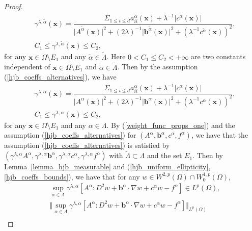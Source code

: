 \documentclass[12pt]{amsart}
\newcommand{\boldx}{\boldsymbol{x}}
\theoremstyle{definition}
\theoremstyle{remark}
\begin{document}
\begin{proof}
\begin{align*}
& \gamma^{\lambda,\tilde{\alpha}}(\boldx) 
= \dfrac{\Sigma_{1\leq i \leq d}a_{ii}^{\tilde{\alpha}}
(\boldx)+ \lambda^{-1}\vert c^{\tilde{\alpha}}(\boldx)
\vert}{\vert A^{\tilde{\alpha}}(\boldx)\vert^{2}+(2\lambda)^{-1}
\vert \boldsymbol{b}^{\tilde{\alpha}}(\boldx)\vert^{2} 
+ (\lambda^{-1}c^{\tilde{\alpha}}(\boldx))^{2}}, \\
& C_{1} \leq \gamma^{\lambda,\tilde{\alpha}}(\boldx) \leq C_{2},
\end{align*}
for any $\boldx \in \Omega \setminus E_{1}$ and 
any $\tilde{\alpha} \in \tilde{\Lambda}$. 
Here $0< C_{1} \leq C_{2}<+\infty$ are two constants independent of 
$\boldx \in \Omega \setminus E_{1}$ and 
$\tilde{\alpha} \in \tilde{\Lambda}$.
Then by the assumption (\ref{hjb_coeffs_alternatives}), we have 
\begin{subequations}
\label{weight_func_props_one}
\begin{align}
& \gamma^{\lambda,\alpha}(\boldx) 
= \dfrac{\Sigma_{1\leq i \leq d}a_{ii}^{\alpha}
(\boldx)+ \lambda^{-1}\vert c^{\alpha}(\boldx)\vert}{ 
\vert A^{\alpha}(\boldx)\vert^{2}+(2\lambda)^{-1}
\vert \boldsymbol{b}^{\alpha}(\boldx)\vert^{2}
+(\lambda^{-1}c^{\alpha}(\boldx))^{2}},\\
& C_{1} \leq \gamma^{\lambda,\alpha}(\boldx) \leq C_{2},
\end{align}
\end{subequations}
for any $\boldx\in\Omega\setminus E_{1}$ and 
any $\alpha \in \Lambda$.
By (\ref{weight_func_props_one}) and the assumption (\ref{hjb_coeffs_alternatives}) 
for $(A^{\alpha},\boldsymbol{b}^{\alpha}, c^{\alpha},f^{\alpha})$,  
we have that the assumption (\ref{hjb_coeffs_alternatives}) is satisfied by 
$(\gamma^{\lambda,\alpha}A^{\alpha},\gamma^{\lambda,\alpha}\boldsymbol{b}^{\alpha},
\gamma^{\lambda,\alpha}c^{\alpha},\gamma^{\lambda,\alpha}f^{\alpha})$ 
with $\tilde{\Lambda}\subset \Lambda$ and the set $E_{1}$.
Then by Lemma~\ref{lemma_hjb_measurable} and (\ref{hjb_uniform_ellipticity},\ref{hjb_coeffs_bounds}), we 
have that for any $w\in W^{2,p}(\Omega) \cap W_{0}^{1,p}(\Omega)$,
\begin{align}
\label{hjb_sol_bound}
& \sup_{\alpha \in \Lambda} \gamma^{\lambda,\alpha}[A^{\alpha}:D^{2}w 
+ \boldsymbol{b}^{\alpha}\cdot \nabla w 
+ c^{\alpha}w - f^{\alpha}] \in L^{p}(\Omega),\\
\nonumber
& \Vert \sup_{\alpha \in \Lambda} \gamma^{\lambda,\alpha}[A^{\alpha}:D^{2}w 
+ \boldsymbol{b}^{\alpha}\cdot \nabla w 
+ c^{\alpha}w - f^{\alpha}]\Vert_{L^{p}(\Omega)} \\

\end{align}
\end{proof}
\end{document}
